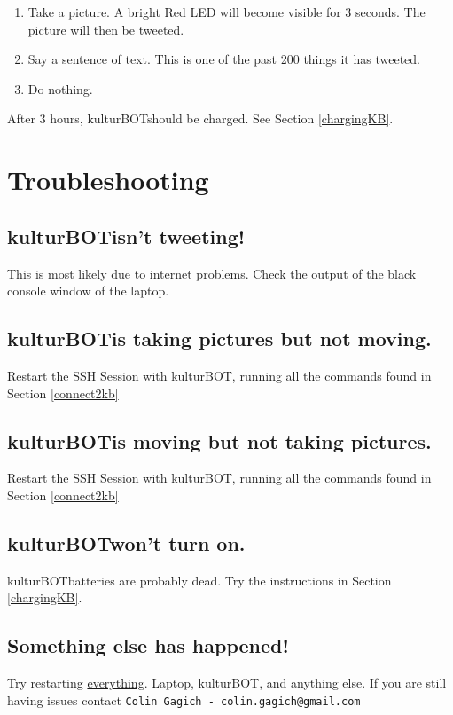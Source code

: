 \documentclass[]{article}
\newcommand{\kb}{kulturBOT}
\newcommand{\kbspace}{\kb \space}
\begin{document}
\begin{enumerate}
\item Take a picture. A bright Red LED will become visible for 3 seconds. The picture will then be tweeted.
\item Say a sentence of text. This is one of the past 200 things it has tweeted.
\item Do nothing.
\end{enumerate}

After 3 hours, \kbspace should be charged. See Section \ref{chargingKB}.

\section{Troubleshooting}
\subsection{\kbspace isn't tweeting!}
\label{kbNoTweet}
This is most likely due to internet problems. Check the output of the black console window of the laptop.
\subsection{\kbspace is taking pictures but not moving.}
Restart the SSH Session with \kb, running all the commands found in Section \ref{connect2kb}
\subsection{\kbspace is moving but not taking pictures.}
Restart the SSH Session with \kb, running all the commands found in Section \ref{connect2kb}
\subsection{\kbspace won't turn on.}
\kbspace batteries are probably dead. Try the instructions in Section \ref{chargingKB}.

\subsection{Something else has happened!}
Try restarting \underline{everything}. Laptop, \kb, and anything else. If you are still having issues contact \texttt{Colin Gagich - colin.gagich@gmail.com}
\end{document}
